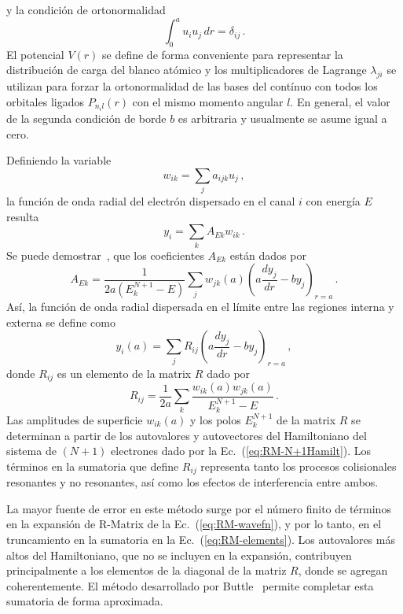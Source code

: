 y la condición de ortonormalidad
\begin{equation}
\int_0^au_iu_j\,dr=\delta_{ij}\,.
\end{equation}
El potencial $V(r)$ se define de forma conveniente para representar la
distribución de carga del blanco atómico y los multiplicadores de 
Lagrange $\lambda_{ji}$ se utilizan para forzar la ortonormalidad de las
bases del contínuo con todos los orbitales ligados $P_{n_il}(r)$ con el
mismo momento angular $l$. En general, el valor de la segunda condición 
de borde $b$ es arbitraria y usualmente se asume igual a cero.

Definiendo la variable
\begin{equation}
w_{ik}=\sum_j a_{ijk}u_j\,,
\end{equation}
la función de onda radial del electrón dispersado en el canal $i$ con 
energía $E$ resulta
\begin{equation}
y_i=\sum_kA_{Ek}w_{ik}\,.
\end{equation}
Se puede demostrar~\cite{Burke:75}, que los coeficientes $A_{Ek}$ 
están dados por
\begin{equation}
A_{Ek}=\frac{1}{2a\left(E_k^{N+1}-E\right)}\sum_jw_{jk}(a)
\left(a\frac{dy_j}{dr}-by_j\right)_{r=a}\,.
\end{equation}
Así, la función de onda radial dispersada en el límite entre las 
regiones interna y externa se define como
\begin{equation}
y_i(a)=\sum_j R_{ij}\left(a\frac{dy_j}{dr}-by_j\right)_{r=a}\,,
\end{equation}
donde $R_{ij}$ es un elemento de la matrix $R$ dado por
\begin{equation}
R_{ij} = \frac{1}{2a}\sum_k\frac{w_{ik}(a)w_{jk}(a)}{E_k^{N+1}-E}\,.
\label{eq:RM-elements}
\end{equation}
Las amplitudes de superficie $w_{ik}(a)$ y los polos $E_k^{N+1}$ de la 
matrix $R$ se determinan a partir de los autovalores y autovectores del 
Hamiltoniano del sistema de $(N+1)$ electrones dado por la 
Ec.~(\ref{eq:RM-N+1Hamilt}). Los términos en la sumatoria que define 
$R_{ij}$ representa tanto los procesos colisionales resonantes y no 
resonantes, así como los efectos de interferencia entre ambos.

La mayor fuente de error en este método surge por el número finito de 
términos en la expansión de R-Matrix de la Ec.~(\ref{eq:RM-wavefn}), y 
por lo tanto, en el truncamiento en la sumatoria en la 
Ec.~(\ref{eq:RM-elements}). Los autovalores más altos del Hamiltoniano,
que no se incluyen en la expansión, contribuyen principalmente a los 
elementos de la diagonal de la matriz $R$, donde se agregan 
coherentemente. El método desarrollado por Buttle~\cite{Buttle:67} 
permite completar esta sumatoria de forma aproximada. 

